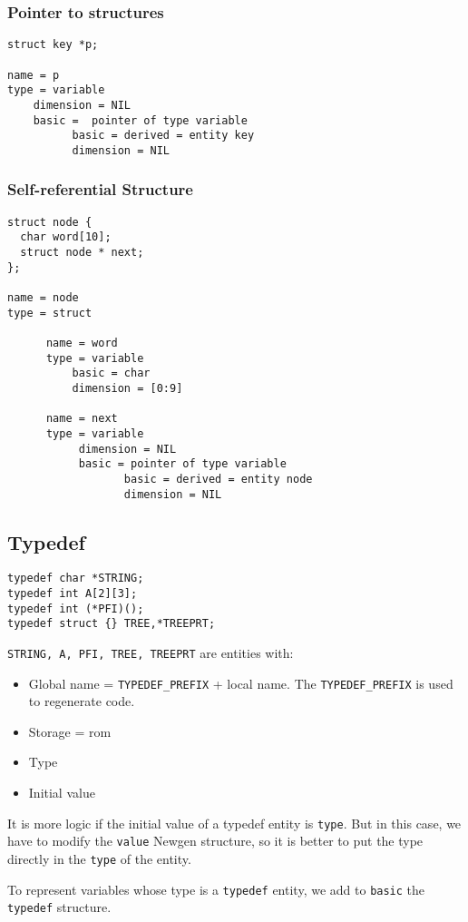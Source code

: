 \documentclass[a4paper]{article}
\begin{document}
\subsubsection{Pointer to structures}
\begin{verbatim}
struct key *p;

name = p
type = variable
    dimension = NIL
    basic =  pointer of type variable
          basic = derived = entity key
          dimension = NIL
\end{verbatim}
\subsubsection{Self-referential Structure}
\begin{verbatim}
struct node {
  char word[10];
  struct node * next;
};

name = node
type = struct 

      name = word
      type = variable
          basic = char
          dimension = [0:9] 

      name = next
      type = variable
           dimension = NIL
           basic = pointer of type variable
                  basic = derived = entity node
                  dimension = NIL
\end{verbatim}
 
\subsection{Typedef}
\begin{verbatim}
typedef char *STRING;
typedef int A[2][3];
typedef int (*PFI)();
typedef struct {} TREE,*TREEPRT;
\end{verbatim}
\verb/STRING, A, PFI, TREE, TREEPRT/ are entities with:
\begin{itemize}
\item Global name = \verb/TYPEDEF_PREFIX/ + local name. The \verb/TYPEDEF_PREFIX/ is
  used to regenerate code. 
\item Storage = rom 
\item Type 
\item Initial value
\end{itemize}
It is more logic if the initial value of a typedef entity is
\verb/type/. But in this case, we have to modify the \verb/value/ Newgen
structure, so it is better to put the type directly in the \verb/type/ of
the entity.

To represent variables whose type is a \verb/typedef/ entity, we add to
\verb/basic/ the \verb/typedef/ structure. 
\end{document}

